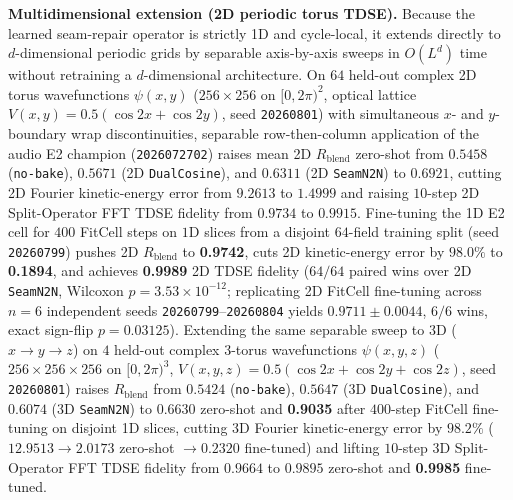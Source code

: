 \textbf{Multidimensional extension (2D periodic torus TDSE).}
Because the learned seam-repair operator is strictly 1D and cycle-local, it extends directly to $d$-dimensional periodic grids by separable axis-by-axis sweeps in $O(L^d)$ time without retraining a $d$-dimensional architecture.
On $64$ held-out complex 2D torus wavefunctions $\psi(x,y)$ ($256{\times}256$ on $[0,2\pi)^2$, optical lattice $V(x,y){=}0.5(\cos 2x+\cos 2y)$, seed \texttt{20260801}) with simultaneous $x$- and $y$-boundary wrap discontinuities, separable row-then-column application of the audio E2 champion (\texttt{2026072702}) raises mean 2D $R_{\mathrm{blend}}$ zero-shot from $0.5458$ (\texttt{no-bake}), $0.5671$ (2D \texttt{DualCosine}), and $0.6311$ (2D \texttt{SeamN2N}) to $0.6921$, cutting 2D Fourier kinetic-energy error from $9.2613$ to $1.4999$ and raising $10$-step 2D Split-Operator FFT TDSE fidelity from $0.9734$ to $0.9915$.
Fine-tuning the 1D E2 cell for $400$ FitCell steps on $1$D slices from a disjoint $64$-field training split (seed \texttt{20260799}) pushes 2D $R_{\mathrm{blend}}$ to \textbf{0.9742}, cuts 2D kinetic-energy error by $98.0\%$ to \textbf{0.1894}, and achieves \textbf{0.9989} 2D TDSE fidelity ($64/64$ paired wins over 2D \texttt{SeamN2N}, Wilcoxon $p{=}3.53{\times}10^{-12}$; replicating 2D FitCell fine-tuning across $n{=}6$ independent seeds \texttt{20260799}--\texttt{20260804} yields $0.9711{\pm}0.0044$, $6/6$ wins, exact sign-flip $p{=}0.03125$).
Extending the same separable sweep to $3$D ($x{\to}y{\to}z$) on $4$ held-out complex 3-torus wavefunctions $\psi(x,y,z)$ ($256{\times}256{\times}256$ on $[0,2\pi)^3$, $V(x,y,z){=}0.5(\cos 2x+\cos 2y+\cos 2z)$, seed \texttt{20260801}) raises $R_{\mathrm{blend}}$ from $0.5424$ (\texttt{no-bake}), $0.5647$ (3D \texttt{DualCosine}), and $0.6074$ (3D \texttt{SeamN2N}) to $0.6630$ zero-shot and \textbf{0.9035} after $400$-step FitCell fine-tuning on disjoint 1D slices, cutting 3D Fourier kinetic-energy error by $98.2\%$ ($12.9513\to 2.0173$ zero-shot $\to \mathbf{0.2320}$ fine-tuned) and lifting $10$-step 3D Split-Operator FFT TDSE fidelity from $0.9664$ to $0.9895$ zero-shot and \textbf{0.9985} fine-tuned.

